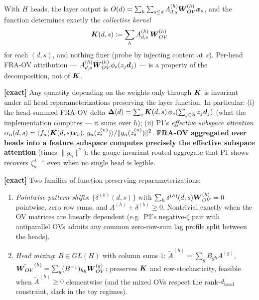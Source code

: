 \documentclass{article}
\begin{document}
With $H$ heads, the layer output is $O(d) = \sum_h\sum_{s\le d} A^{(h)}_{d,s}\boldsymbol{W}_{OV}^{(h)}\boldsymbol{x}_s$, and the function determines exactly the \emph{collective kernel}
\begin{equation}
    \boldsymbol{K}(d,s) := \sum_h A^{(h)}_{d,s}\,\boldsymbol{W}_{OV}^{(h)}
\end{equation}
for each $(d,s)$, and nothing finer (probe by injecting content at $s$). Per-head FRA-OV attribution --- $A^{(h)}_{d,s}\boldsymbol{W}_{OV}^{(h)}\phi_s(z_j\boldsymbol{d}_j)$ --- is a property of the decomposition, not of $\boldsymbol{K}$.

\begin{prop}[invariants]\label{prop:headinv}
\textbf{[exact]} Any quantity depending on the weights only through $\boldsymbol{K}$ is invariant under all head reparameterizations preserving the layer function. In particular: (i) the head-summed FRA-OV delta $\boldsymbol{\Delta}(d) = \sum_s\boldsymbol{K}(d,s)\,\phi_s(\sum_{j\in S} z_j\boldsymbol{d}_j)$ (what the implementation computes --- it sums over $h$); (ii) P1's \emph{effective subspace attention} $\alpha_n(d,s) = \langle f_n(\boldsymbol{K}(d,s)\boldsymbol{x}_s),\, g_n(z_s^{(n)})\rangle/\|g_n(z_s^{(n)})\|^2$. \textbf{FRA-OV aggregated over heads into a feature subspace computes precisely the effective subspace attention} (times $\|g_n\|^2$): the gauge-invariant routed aggregate that P1 shows recovers $\zeta_n^{d-s}$ even when no single head is legible.
\end{prop}

\begin{prop}\label{prop:headgauge}
\textbf{[exact]} Two families of function-preserving reparameterizations:
\begin{enumerate}
    \item \emph{Pointwise pattern shifts}: $\{\delta^{(h)}(d,s)\}$ with $\sum_h\delta^{(h)}(d,s)\boldsymbol{W}_{OV}^{(h)} = 0$ pointwise, zero row sums, and $A^{(h)} + \delta^{(h)} \ge 0$. Nontrivial exactly when the OV matrices are linearly dependent (e.g.\ P2's negative-$\zeta$ pair with antiparallel OVs admits any common zero-row-sum lag profile split between the heads).
    \item \emph{Head mixing}: $B \in GL(H)$ with column sums $1$: $\tilde A^{(h)} = \sum_g B_{gh}A^{(g)}$, $\tilde{\boldsymbol{W}_{OV}}^{(h)} = \sum_g(B^{-1})_{hg}\boldsymbol{W}_{OV}^{(g)}$; preserves $\boldsymbol{K}$ and row-stochasticity, feasible when $\tilde A^{(h)} \ge 0$ elementwise (and the mixed OVs respect the rank-$d_{\mathrm{head}}$ constraint, slack in the toy regimes).
\end{enumerate}
\end{prop}
\end{document}
